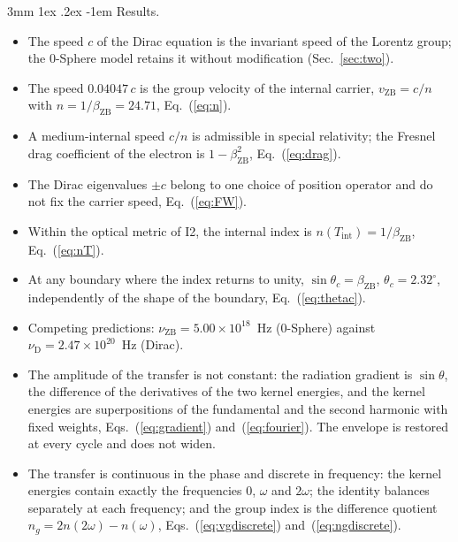 \documentclass[%
 reprint, amsmath,amssymb, aps, prb, ]{revtex4-2}
\makeatletter
\numberwithin{equation}{section}
\renewcommand\paragraph{%
  \@startsection{paragraph}{4}{\z@}%
    {3mm \@plus 1ex \@minus .2ex}%
    {-1em}%
    {\normalfont\normalsize\itshape}}
\makeatother
\begin{document}
\paragraph{Results.}
\begin{itemize}[leftmargin=2.4em]
\item[R1.] The speed $c$ of the Dirac equation is the invariant speed of the Lorentz group; the 0-Sphere model retains it without modification (Sec.~\ref{sec:two}).
\item[R2.] The speed $0.04047\,c$ is the group velocity of the internal carrier, $v_{\text{ZB}} = c/n$ with $n = 1/\beta_{\text{ZB}} = 24.71$, Eq.~(\ref{eq:n}).
\item[R3.] A medium-internal speed $c/n$ is admissible in special relativity; the Fresnel drag coefficient of the electron is $1 - \beta_{\text{ZB}}^2$, Eq.~(\ref{eq:drag}).
\item[R4.] The Dirac eigenvalues $\pm c$ belong to one choice of position operator and do not fix the carrier speed, Eq.~(\ref{eq:FW}).
\item[R5.] Within the optical metric of I2, the internal index is $n(T_{\text{int}}) = 1/\beta_{\text{ZB}}$, Eq.~(\ref{eq:nT}).
\item[R6.] At any boundary where the index returns to unity, $\sin\theta_c = \beta_{\text{ZB}}$, $\theta_c = 2.32^\circ$, independently of the shape of the boundary, Eq.~(\ref{eq:thetac}).
\item[R7.] Competing predictions: $\nu_{\text{ZB}} = 5.00\times10^{18}$~Hz (0-Sphere) against $\nu_{\text{D}} = 2.47\times10^{20}$~Hz (Dirac).
\item[R8.] The amplitude of the transfer is not constant: the radiation gradient is $\sin\theta$, the difference of the derivatives of the two kernel energies, and the kernel energies are superpositions of the fundamental and the second harmonic with fixed weights, Eqs.~(\ref{eq:gradient}) and~(\ref{eq:fourier}). The envelope is restored at every cycle and does not widen.
\item[R9.] The transfer is continuous in the phase and discrete in frequency: the kernel energies contain exactly the frequencies $0$, $\omega$ and $2\omega$; the identity balances separately at each frequency; and the group index is the difference quotient $n_g = 2n(2\omega) - n(\omega)$, Eqs.~(\ref{eq:vgdiscrete}) and~(\ref{eq:ngdiscrete}).
\end{itemize}
\end{document}
